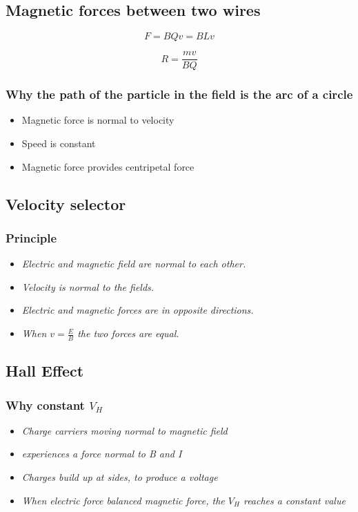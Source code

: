 \documentclass[a4paper,9pt]{scrartcl}
\begin{document}
    \subsection{Magnetic forces between two wires}

    \begin{displaymath}
        F = BQv = BLv
    \end{displaymath}

    \begin{displaymath}
        R = \frac{mv}{BQ}
    \end{displaymath}

    \subsubsection{Why the path of the particle in the field is the arc of a circle}
    \begin{itemize}
        \item Magnetic force is normal to velocity
        \item Speed is constant
        \item Magnetic force provides centripetal force
    \end{itemize}

    \subsection{Velocity selector}

    \subsubsection{Principle}
    \begin{itemize}
        \item \textit{Electric and magnetic field are normal to each other.}
        \item \textit{Velocity is normal to the fields.}
        \item \textit{Electric and magnetic forces are in opposite directions.}
        \item \textit{When $v=\frac{E}{B}$ the two forces are equal.}
    \end{itemize}

    \subsection{Hall Effect}

    \subsubsection{Why constant $V_H$}
    \begin{itemize}
        \item \textit{Charge carriers moving normal to magnetic field}
        \item \textit{experiences a force normal to B and I}
        \item \textit{Charges build up at sides, to produce a voltage}
        \item \textit{When electric force balanced magnetic force, the $V_H$ reaches a constant value}
    \end{itemize}
\end{document}
